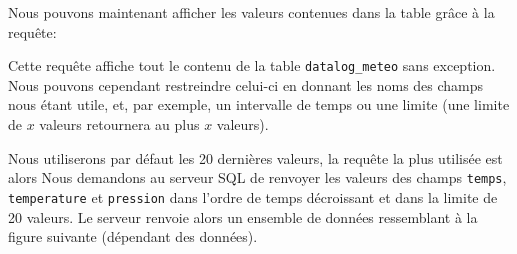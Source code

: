 Nous pouvons maintenant afficher les valeurs contenues dans la table grâce à la requête:

Cette requête affiche tout le contenu de la table \verb-datalog_meteo- sans exception. Nous pouvons cependant restreindre celui-ci en donnant les noms des champs nous étant utile, et, par exemple, un intervalle de temps ou une limite (une limite de $x$ valeurs retournera au plus $x$ valeurs).

Nous utiliserons par défaut les 20 dernières valeurs, la requête la plus utilisée est alors 
Nous demandons au serveur SQL de renvoyer les valeurs des champs \verb-temps-, \verb-temperature- et \verb-pression- dans l'ordre de temps décroissant et dans la limite de 20 valeurs. Le serveur renvoie alors un ensemble de données ressemblant à la figure suivante (dépendant des données).

